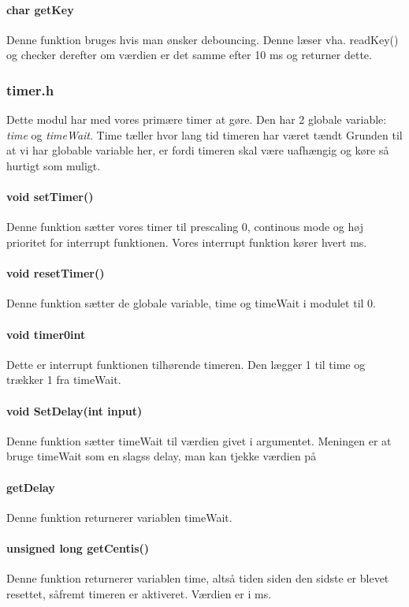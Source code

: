\paragraph{char getKey}
Denne funktion bruges hvis man ønsker debouncing. Denne læser vha. readKey() og checker derefter om værdien er det samme efter 10 ms og returner dette.
\subsubsection{timer.h}
Dette modul har med vores primære timer at gøre. Den har 2 globale variable: \textit{time} og \textit{timeWait}. Time tæller hvor lang tid timeren har været tændt Grunden til at vi har globable variable her, er fordi timeren skal være uafhængig og køre så hurtigt som muligt.
\paragraph{void setTimer()}
Denne funktion sætter vores timer til prescaling 0, continous mode og høj prioritet for interrupt funktionen. Vores interrupt funktion kører hvert ms.
\paragraph{void resetTimer()}
Denne funktion sætter de globale variable, time og timeWait i modulet til 0.
\paragraph{void timer0int}
Dette er interrupt funktionen tilhørende timeren. Den lægger 1 til time og trækker 1 fra timeWait. 
\paragraph{void SetDelay(int input)}
Denne funktion sætter timeWait til værdien givet i argumentet. Meningen er at bruge timeWait som en slagss delay, man kan tjekke værdien på
\paragraph{getDelay}
Denne funktion returnerer variablen timeWait.
\paragraph{unsigned long getCentis()}
Denne funktion returnerer variablen time, altså tiden siden den sidste er blevet resettet, såfremt timeren er aktiveret. Værdien er i ms.

